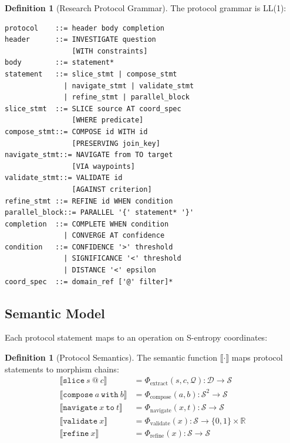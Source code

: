 \documentclass[10pt,twocolumn]{article}
\theoremstyle{definition}
\newtheorem{definition}[theorem]{Definition}
\theoremstyle{remark}
\newcommand{\Sspace}{\mathcal{S}}
\newcommand{\morphism}{\Phi}
\newcommand{\question}{\mathcal{Q}}
\newcommand{\dataset}{\mathcal{D}}
\begin{document}
\begin{definition}[Research Protocol Grammar]
The protocol grammar is LL(1):
\begin{verbatim}
protocol    ::= header body completion
header      ::= INVESTIGATE question
                [WITH constraints]
body        ::= statement*
statement   ::= slice_stmt | compose_stmt
              | navigate_stmt | validate_stmt
              | refine_stmt | parallel_block
slice_stmt  ::= SLICE source AT coord_spec
                [WHERE predicate]
compose_stmt::= COMPOSE id WITH id
                [PRESERVING join_key]
navigate_stmt::= NAVIGATE from TO target
                [VIA waypoints]
validate_stmt::= VALIDATE id
                [AGAINST criterion]
refine_stmt ::= REFINE id WHEN condition
parallel_block::= PARALLEL '{' statement* '}'
completion  ::= COMPLETE WHEN condition
              | CONVERGE AT confidence
condition   ::= CONFIDENCE '>' threshold
              | SIGNIFICANCE '<' threshold
              | DISTANCE '<' epsilon
coord_spec  ::= domain_ref ['@' filter]*
\end{verbatim}
\end{definition}

\subsection{Semantic Model}

Each protocol statement maps to an operation on S-entropy coordinates:

\begin{definition}[Protocol Semantics]
\label{def:semantics}
The semantic function $\llbracket \cdot \rrbracket$ maps protocol statements to morphism chains:
\begin{align}
\llbracket \texttt{slice}~s~@~c \rrbracket &= \morphism_{\text{extract}}(s, c, \question) : \dataset \to \Sspace \label{eq:slice_sem} \\
\llbracket \texttt{compose}~a~\texttt{with}~b \rrbracket &= \morphism_{\text{compose}}(a, b) : \Sspace^2 \to \Sspace \label{eq:compose_sem} \\
\llbracket \texttt{navigate}~x~\texttt{to}~t \rrbracket &= \morphism_{\text{navigate}}(x, t) : \Sspace \to \Sspace \label{eq:navigate_sem} \\
\llbracket \texttt{validate}~x \rrbracket &= \morphism_{\text{validate}}(x) : \Sspace \to \{0,1\} \times \mathbb{R} \label{eq:validate_sem} \\
\llbracket \texttt{refine}~x \rrbracket &= \morphism_{\text{refine}}(x) : \Sspace \to \Sspace \label{eq:refine_sem}
\end{align}
\end{definition}
\end{document}
